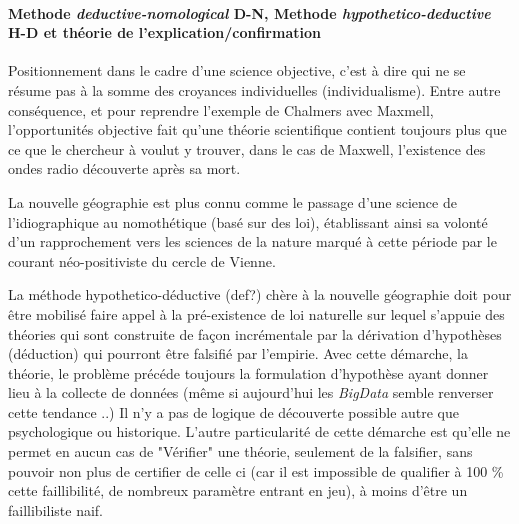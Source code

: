 {\paragraph{Methode \textit{deductive-nomological} D-N, Methode \textit{hypothetico-deductive} H-D et théorie de l'explication/confirmation }
\cite{Paterson : David Harvey's Geography}

Positionnement dans le cadre d'une science objective, c'est à dire qui ne se résume pas à la somme des croyances individuelles (individualisme). Entre autre conséquence, et pour reprendre l'exemple de Chalmers avec Maxmell, l'opportunités objective fait qu'une théorie scientifique contient toujours plus que ce que le chercheur à voulut y trouver, dans le cas de Maxwell, l'existence des ondes radio découverte après sa mort.

La nouvelle géographie est plus connu comme le passage d'une science de l'idiographique au nomothétique (basé sur des loi), établissant ainsi sa volonté d'un rapprochement vers les sciences de la nature marqué à cette période par le courant néo-positiviste du cercle de Vienne. 

La méthode hypothetico-déductive (def?) chère à la nouvelle géographie doit pour être mobilisé faire appel à la pré-existence de loi naturelle sur lequel s'appuie des théories qui sont construite de façon incrémentale par la dérivation d'hypothèses (déduction) qui pourront être falsifié par l'empirie. Avec cette démarche, la théorie, le problème précéde toujours la formulation d'hypothèse ayant donner lieu à la collecte de données (même si aujourd'hui les \textit{BigData} semble renverser cette tendance ..) Il n'y a pas de logique de découverte possible autre que psychologique ou historique. L'autre particularité de cette démarche est qu'elle ne permet en aucun cas de "Vérifier" une théorie, seulement de la falsifier, sans pouvoir non plus de certifier de celle ci (car il est impossible de qualifier à 100 \% cette faillibilité, de nombreux paramètre entrant en jeu), à moins d'être un faillibiliste naif. 


}
